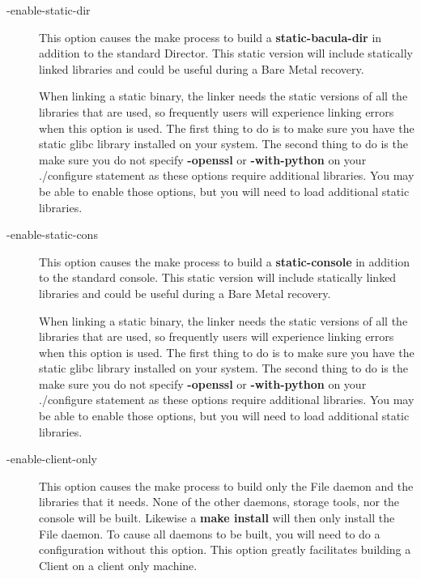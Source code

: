 \begin{description}
\item [ {-}{\-}enable-static-dir]
   This option causes the make process to build a {\bf static-bacula-dir}
   in addition to the standard Director.  This static version will include
   statically linked libraries and could be useful during a Bare Metal
   recovery.

   When linking a static binary, the linker needs the static versions
   of all the libraries that are used, so frequently users will 
   experience linking errors when this option is used. The first 
   thing to do is to make sure you have the static glibc library 
   installed on your system. The second thing to do is the make sure
   you do not specify {\bf {-}{\-}openssl} or {\bf {-}{\-}with-python}
   on your ./configure statement as these options require additional
   libraries. You may be able to enable those options, but you will
   need to load additional static libraries.


\item [ {-}{\-}enable-static-cons]
   This option causes the make process to build a {\bf static-console} in
   addition to the standard console.  This static version will include
   statically linked libraries and could be useful during a Bare Metal
   recovery.

   When linking a static binary, the linker needs the static versions
   of all the libraries that are used, so frequently users will 
   experience linking errors when this option is used. The first 
   thing to do is to make sure you have the static glibc library 
   installed on your system. The second thing to do is the make sure
   you do not specify {\bf {-}{\-}openssl} or {\bf {-}{\-}with-python}
   on your ./configure statement as these options require additional
   libraries. You may be able to enable those options, but you will
   need to load additional static libraries.


\item [ {-}{\-}enable-client-only]
   This option causes the make process to build only the File daemon and
   the libraries that it needs.  None of the other daemons, storage tools,
   nor the console will be built.  Likewise a {\bf make install} will then
   only install the File daemon.  To cause all daemons to be built, you
   will need to do a configuration without this option.  This option
   greatly facilitates building a Client on a client only machine.


\end{description}
